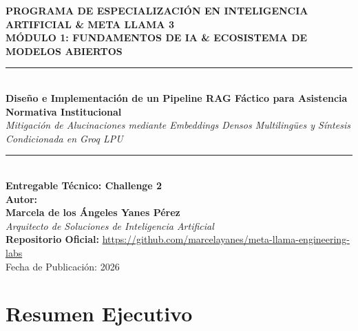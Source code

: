 \documentclass[12pt,letterpaper]{article}
\begin{document}
\begin{titlepage}
  \centering
  \vspace*{1.5cm}
  
  {\Large\textbf{PROGRAMA DE ESPECIALIZACIÓN EN INTELIGENCIA ARTIFICIAL \& META LLAMA 3}}\\[0.8cm]
  {\large\textbf{MÓDULO 1: FUNDAMENTOS DE IA \& ECOSISTEMA DE MODELOS ABIERTOS}}\\[1.5cm]
  
  \rule{\linewidth}{0.6mm}\\[0.5cm]
  {\LARGE\textbf{Diseño e Implementación de un Pipeline RAG Fáctico para Asistencia Normativa Institucional}}\\[0.3cm]
  {\large\textit{Mitigación de Alucinaciones mediante Embeddings Densos Multilingües y Síntesis Condicionada en Groq LPU}}\\[0.2cm]
  \rule{\linewidth}{0.6mm}\\[2cm]
  
  \textbf{Entregable Técnico: Challenge 2}\\[0.8cm]
  
  \textbf{Autor:}\\
  {\Large\textbf{Marcela de los Ángeles Yanes Pérez}}\\
  \textit{Arquitecto de Soluciones de Inteligencia Artificial}\\[2.5cm]
  
  \vfill
  {\large\textbf{Repositorio Oficial:}} \url{https://github.com/marcelayanes/meta-llama-engineering-labs}\\[0.3cm]
  {\small Fecha de Publicación: 2026}
\end{titlepage}

\newpage
{}

\section*{Resumen Ejecutivo}
\end{document}
